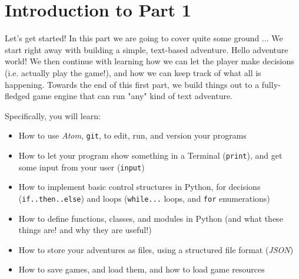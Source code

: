 \chapter*{Introduction to Part 1} 

Let's get started! In this part we are going to cover quite some ground ... We start right away with building a simple, text-based adventure. Hello adventure world! We then continue with learning how we can let the player make decisions (i.e. actually play the game!), and how we can keep track of what all is happening. Towards the end of this first part, we build things out to a fully-fledged game engine that can run "any" kind of text adventure. 

Specifically, you will learn: 
\begin{itemize}
\item How to use \textit{Atom}, \texttt{git}, to edit, run, and version your programs
\item How to let your program show something in a Terminal (\texttt{print}), and get some input from your user (\texttt{input})  
\item How to implement basic control structures in Python, for decisions (\texttt{if..then..else}) and loops (\texttt{while...} loops, and \texttt{for} enumerations) 
\item How to define functions, classes, and modules in Python (and what these things are! and why they are useful!)  
\item How to store your adventures as files, using a structured file format (\textit{JSON})
\item How to save games, and load them, and how to load game resources 
\end{itemize}


